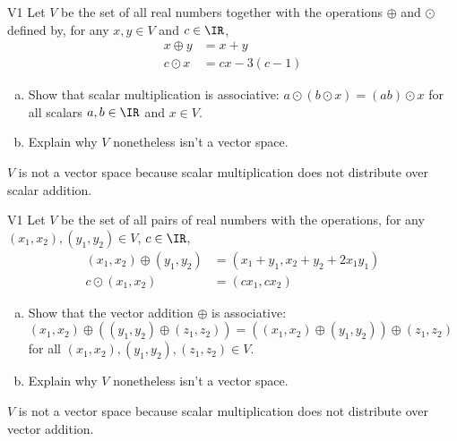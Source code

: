 \begin{problem}{V1}
Let \(V\) be the  set of all real numbers together with the operations \(\oplus\) and \(\odot\) defined by, for any \(x,y\in V\) and \(c\in \IR\),
\begin{align*}
x\oplus y  &= x+y \\
c \odot x &= cx-3(c-1)
\end{align*}
\begin{enumerate}[(a)]
\item Show that scalar multiplication is associative: 
      \(a\odot(b\odot x)=(ab)\odot x\) for all scalars \(a,b \in \IR\) and \(x \in V\).
\item Explain why \(V\) nonetheless isn't a vector space.
\end{enumerate}
\end{problem}
\begin{solution}
$V$ is not a vector space because scalar multiplication does not distribute over scalar addition.
\end{solution}


\begin{problem}{V1}
Let \(V\) be the set of all pairs of real numbers with the operations, for any \((x_1,x_2), (y_1,y_2) \in V\), \(c\in \IR\),
\begin{align*}
(x_1,x_2) \oplus (y_1,y_2) &= (x_1+y_1,x_2+y_2+2x_1y_1) \\
c \odot (x_1,x_2) &= (cx_1, cx_2)
\end{align*}
\begin{enumerate}[(a)]
\item Show that the vector addition \(\oplus\) is associative:
      \((x_1,x_2) \oplus ((y_1,y_2) \oplus (z_1,z_2))=((x_1,x_2)\oplus (y_1,y_2))\oplus (z_1,z_2)\) for all \((x_1,x_2), (y_1,y_2), (z_1,z_2) \in V\).
\item Explain why \(V\) nonetheless isn't a vector space.
\end{enumerate}
\end{problem}
\begin{solution}
$V$ is not a vector space because scalar multiplication does not distribute over vector addition.
\end{solution}



